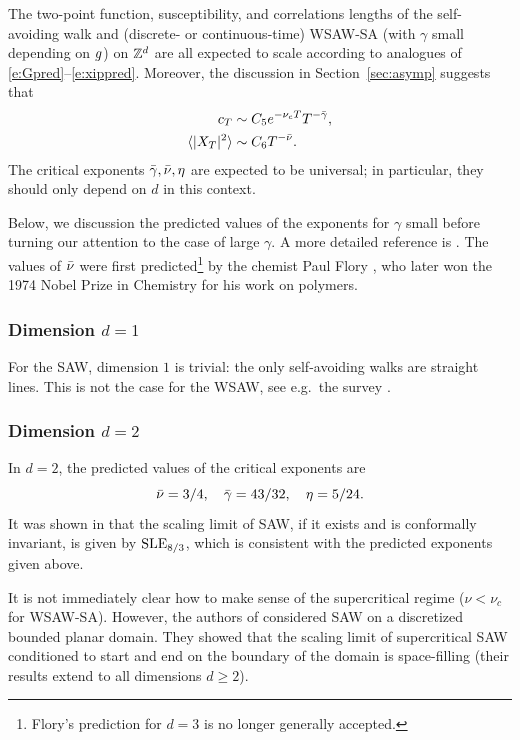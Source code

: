 The two-point function, susceptibility, and correlations lengths of the
self-avoiding walk and (discrete- or continuous-time) WSAW-SA (with $\gamma$ small
depending on $g$) on ${ {{\mathbb Z}}^d }$ are all expected
to scale according to analogues of \eqref{e:Gpred}--\eqref{e:xippred}.
Moreover, the discussion in Section~\ref{sec:asymp} suggests that
\begin{align}
c_T                       &\sim C_5 e^{-\nu_c T} T^{-\bar\gamma}, \\
\langle |X_T|^2 \rangle   &\sim C_6 T^{-\bar\nu}.
\end{align}
The critical exponents $\bar\gamma, \bar\nu, \eta$ are expected to be universal;
in particular, they should only depend on $d$ in this context.

Below, we discussion the predicted values of the exponents for $\gamma$ small before
turning our attention to the case of large $\gamma$. A more detailed reference is
\cite{MS93}. The values of $\bar\nu$ were first predicted\footnote{Flory's prediction
for $d = 3$ is no longer generally accepted.} by the chemist Paul Flory \cite{Flor49}, who
later won the 1974 Nobel Prize in Chemistry for his work on polymers.

\subsubsection{Dimension $d = 1$}

For the SAW, dimension $1$ is trivial: the only self-avoiding walks are straight
lines. This is not the case for the WSAW, see e.g.\ the survey \cite{HK01}.

\subsubsection{Dimension $d = 2$}

In $d = 2$, the predicted values of the critical exponents are
\begin{equation}
\bar\nu = 3/4, \quad \bar\gamma = 43/32, \quad \eta = 5/24.
\end{equation}
It was shown in \cite{LSW04} that the scaling limit of SAW, if it exists and
is conformally invariant, is given by ${\rm SLE}_{8/3}$, which is consistent with
the predicted exponents given above.

It is not immediately clear how to make sense of the supercritical regime
($\nu < \nu_c$ for WSAW-SA).
However, the authors of \cite{LSW04} considered SAW on a discretized bounded
planar domain. They showed that the scaling limit of supercritical
SAW conditioned to start and end on the boundary of the domain is space-filling
(their results extend to all dimensions $d \ge 2$).

